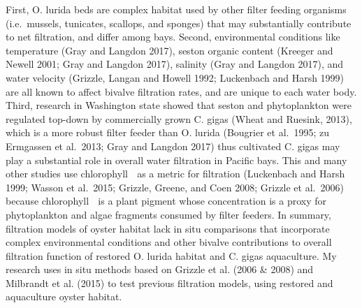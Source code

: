 \documentclass[]{article}
\begin{document}
First, O. lurida beds are complex habitat used by other filter feeding
organisms (i.e.~mussels, tunicates, scallops, and sponges) that may
substantially contribute to net filtration, and differ among bays.
Second, environmental conditions like temperature (Gray and Langdon
2017), seston organic content (Kreeger and Newell 2001; Gray and Langdon
2017), salinity (Gray and Langdon 2017), and water velocity (Grizzle,
Langan and Howell 1992; Luckenbach and Harsh 1999) are all known to
affect bivalve filtration rates, and are unique to each water body.
Third, research in Washington state showed that seston and phytoplankton
were regulated top-down by commercially grown C. gigas (Wheat and
Ruesink, 2013), which is a more robust filter feeder than O. lurida
(Bougrier et al.~1995; zu Ermgassen et al.~2013; Gray and Langdon 2017)
thus cultivated C. gigas may play a substantial role in overall water
filtration in Pacific bays. This and many other studies use chlorophyll
 as a metric for filtration (Luckenbach and Harsh 1999; Wasson et
al.~2015; Grizzle, Greene, and Coen 2008; Grizzle et al.~2006) because
chlorophyll  is a plant pigment whose concentration is a proxy for
phytoplankton and algae fragments consumed by filter feeders. In
summary, filtration models of oyster habitat lack in situ comparisons
that incorporate complex environmental conditions and other bivalve
contributions to overall filtration function of restored O. lurida
habitat and C. gigas aquaculture. My research uses in situ methods based
on Grizzle et al. (2006 \& 2008) and Milbrandt et al. (2015) to test
previous filtration models, using restored and aquaculture oyster
habitat.
\end{document}
